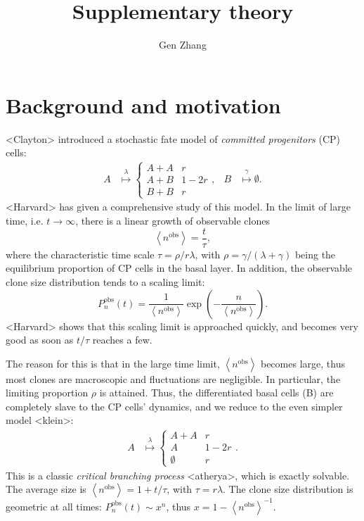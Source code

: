 \documentclass[10pt,UKenglish]{article}
\begin{document}
\title{Supplementary theory}
\author{Gen Zhang}
 
\maketitle

\renewcommand{\thesection}{S-\Roman{section}}

\section{Background and motivation}

<Clayton> introduced a stochastic fate model of \emph{committed progenitors} (CP) cells:
\begin{align}
A &\overset{\lambda}{\longmapsto} \begin{cases}
A+A & r \\
A+B & 1-2r \\
B+B & r\end{cases}, & B &\overset{\gamma}{\longmapsto} \emptyset.
\label{eq:basal-model}
\end{align}
<Harvard> has given a comprehensive study of this model. In the limit of large time, i.e. $t\rightarrow \infty$, there is a linear growth of observable clones $$\left\langle n^\textrm{obs} \right\rangle = \frac{t}{\tau},$$ where the characteristic time scale $\tau = \rho/r\lambda$, with $\rho = \gamma/(\lambda+\gamma)$ being the equilibrium proportion of CP cells in the basal layer. In addition, the observable clone size distribution tends to a scaling limit: $$P^\textrm{obs}_n(t) = \frac{1}{\left\langle n^\textrm{obs} \right\rangle}\exp\left(-\frac{n}{\left\langle n^\textrm{obs} \right\rangle}\right).$$ <Harvard> shows that this scaling limit is approached quickly, and becomes very good as soon as $t/\tau$ reaches a few.

The reason for this is that in the large time limit, $\left\langle n^\textrm{obs} \right\rangle$ becomes large, thus most clones are macroscopic and fluctuations are negligible. In particular, the limiting proportion $\rho$ is attained. Thus, the differentiated basal cells (B) are completely slave to the CP cells' dynamics, and we reduce to the even simpler model <klein>: 
\begin{align}
A &\overset{\lambda}{\longmapsto} \begin{cases}
A+A & r \\
A & 1-2r \\
\emptyset & r\end{cases}\label{eq:simple-balanced-model}.
\end{align}
This is a classic \emph{critical branching process} <atherya>, which is exactly solvable. The average size is $\left\langle n^\textrm{obs} \right\rangle = 1+t/\tau$, with $\tau = r\lambda$. The clone size distribution is geometric at all times: $P^\textrm{obs}_n(t) \sim x^n$, thus $x = 1 - \left\langle n^\textrm{obs} \right\rangle^{-1}$.
\end{document}

